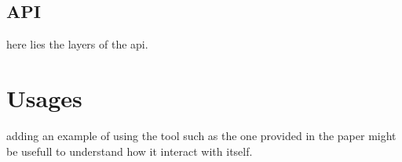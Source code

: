 

\subsection{API}
here lies the layers of the api.

\section{Usages}\label{sec:theo-subgraph}
adding an example of using the tool such as the one provided in the paper might be usefull to understand how it interact with itself.


